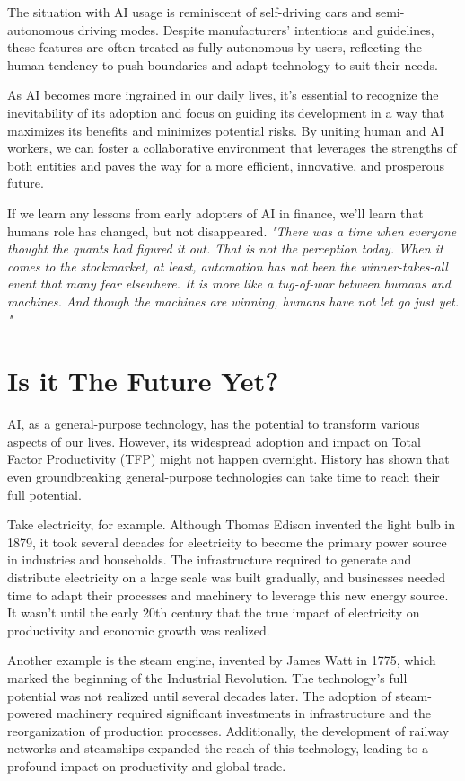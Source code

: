 The situation with AI usage is reminiscent of self-driving cars and semi-autonomous driving modes. Despite manufacturers' intentions and guidelines, these features are often treated as fully autonomous by users, reflecting the human tendency to push boundaries and adapt technology to suit their needs.

As AI becomes more ingrained in our daily lives, it's essential to recognize the inevitability of its adoption and focus on guiding its development in a way that maximizes its benefits and minimizes potential risks. By uniting human and AI workers, we can foster a collaborative environment that leverages the strengths of both entities and paves the way for a more efficient, innovative, and prosperous future. 

If we learn any lessons from early adopters of AI in finance, we'll learn that humans role has changed, but not disappeared. \textit{"There was a time when everyone thought the quants had figured it out. That is not the perception today. When it comes to the stockmarket, at least, automation has not been the winner-takes-all event that many fear elsewhere. It is more like a tug-of-war between humans and machines. And though the machines are winning, humans have not let go just yet. "} 

\section{Is it The Future Yet?}

AI, as a general-purpose technology, has the potential to transform various aspects of our lives. However, its widespread adoption and impact on Total Factor Productivity (TFP) might not happen overnight. History has shown that even groundbreaking general-purpose technologies can take time to reach their full potential.

Take electricity, for example. Although Thomas Edison invented the light bulb in 1879, it took several decades for electricity to become the primary power source in industries and households. The infrastructure required to generate and distribute electricity on a large scale was built gradually, and businesses needed time to adapt their processes and machinery to leverage this new energy source. It wasn't until the early 20th century that the true impact of electricity on productivity and economic growth was realized.

Another example is the steam engine, invented by James Watt in 1775, which marked the beginning of the Industrial Revolution. The technology's full potential was not realized until several decades later. The adoption of steam-powered machinery required significant investments in infrastructure and the reorganization of production processes. Additionally, the development of railway networks and steamships expanded the reach of this technology, leading to a profound impact on productivity and global trade.

